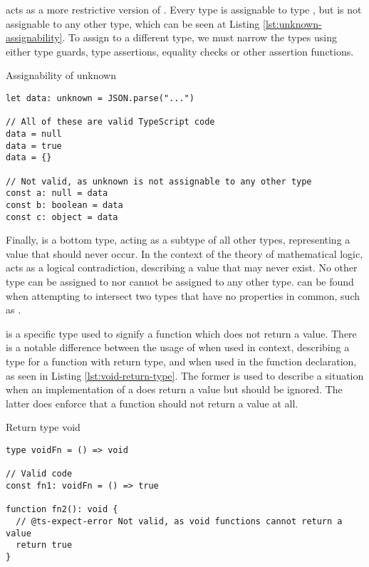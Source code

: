  acts as a more restrictive version of . Every type is assignable to type , but  is not assignable to any other type, which can be seen at Listing \ref{lst:unknown-assignability}. To assign  to a different type, we must narrow the types using either type guards, type assertions, equality checks or other assertion functions.

\begin{listing}[ht]
  \caption{Assignability of unknown}\label{lst:unknown-assignability}
  \begin{verbatim}
let data: unknown = JSON.parse("...") 

// All of these are valid TypeScript code
data = null
data = true
data = {}

// Not valid, as unknown is not assignable to any other type
const a: null = data
const b: boolean = data
const c: object = data
  \end{verbatim}
\end{listing}

Finally,  is a bottom type, acting as a subtype of all other types, representing a value that should never occur. In the context of the theory of mathematical logic,  acts as a logical contradiction, describing a value that may never exist. No other type can be assigned to  nor  cannot be assigned to any other type.  can be found when attempting to intersect two types that have no properties in common, such as .

 is a specific type used to signify a function which does not return a value. There is a notable difference between the usage of  when used in context, describing a type for a function with  return type, and when used in the function declaration, as seen in Listing \ref{lst:void-return-type}. The former is used to describe a situation when an implementation of a  does return a value but should be ignored. The latter does enforce that a function should not return a value at all.

\begin{listing}[ht]
  \caption{Return type void}\label{lst:void-return-type}
  \begin{verbatim}
type voidFn = () => void

// Valid code
const fn1: voidFn = () => true

function fn2(): void {
  // @ts-expect-error Not valid, as void functions cannot return a value
  return true
}
\end{verbatim}
\end{listing}

